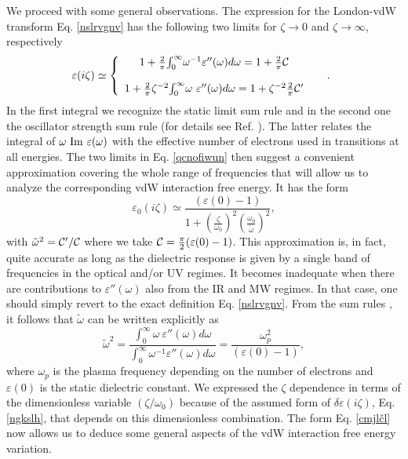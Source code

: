 \documentclass[letterpaper,twocolumn,amsmath,amssymb,floatfix,aps,superscriptaddress]{revtex4}
\begin{document}
We proceed with some general observations. The expression for the London-vdW transform Eq. \ref{nslrvgnv} has the following two limits
for $ \zeta \longrightarrow 0$ and $\zeta \longrightarrow \infty$, respectively
\begin{equation}
\kern-5pt \varepsilon (i \zeta) \simeq \left\{
\begin{array}{cc}
1 + \frac{2}{\pi} {\int_0^{\infty}} \omega^{-1}{{\varepsilon'' (\omega)}}d\omega = 1 + \frac{2}{\pi} {\cal C} & \\
~ & ~ \\
1 + \frac{2}{\pi} \zeta^{-2} {\int_0^{\infty}} \omega ~{{\varepsilon'' (\omega)}}d\omega = 1 +  \zeta^{-2} \frac{2}{\pi}{\cal C}' &  \\
\end{array}
\right. .
\label{qcnofiwun}
\end{equation}
In the first integral we recognize the static limit sum rule and in the second one the oscillator strength sum rule (for details see Ref. \cite{Smith}). The latter relates the integral of $\omega ~{\rm Im} ~\varepsilon (\omega)$ with the effective number of electrons used in transitions at all energies. The two limits in Eq. \ref{qcnofiwun} then suggest a convenient approximation covering the whole range of frequencies that will allow us to analyze the corresponding vdW interaction free energy. It has the form 
\begin{equation}
\varepsilon_0 (i \zeta) \simeq  \frac{(\varepsilon(0) - 1)}{1 + \left(\frac{\zeta}{\omega_0}\right)^{2}\left(\frac{\omega_0}{\tilde\omega}\right)^2}, 
\label{cmjlčl}
\end{equation}
with $\tilde\omega^2  = {\cal C'}/{{\cal C}}$ where we take ${\cal C} = \frac{\pi}{2}(\varepsilon(0) - 1)$.  This approximation is, in fact, quite accurate as long as the dielectric response is given by a single band of frequencies in the optical and/or UV regimes. It becomes inadequate when there are contributions to ${\varepsilon'' (\omega)}$ also from the IR and MW regimes. In that case, one should simply revert to the exact definition Eq. \ref{nslrvgnv}. From the sum rules \cite{Smith}, it follows that $\tilde\omega$  can be written explicitly as
\begin{equation}
\tilde\omega^2 = \frac{{\int_0^{\infty} \omega ~{{\varepsilon'' (\omega)}}d\omega}}{{{\int_0^{\infty}} \omega^{-1}{{\varepsilon'' (\omega)}}d\omega}} = \frac{\omega_p^2}{(\varepsilon(0) - 1)},
\end{equation}
where $\omega_p$ is the plasma frequency depending on the number of electrons and $\varepsilon(0) $ is the static dielectric constant. We expressed the $\zeta$ dependence in terms of the dimensionless variable $(\zeta/\omega_0)$ because of the assumed form of $\delta \varepsilon(i \zeta)$, Eq. \ref{ngkslh}, that depends on this dimensionless combination. The form Eq. \ref{cmjlčl} now allows us to deduce some general aspects of the vdW interaction free energy variation. 
\end{document}
